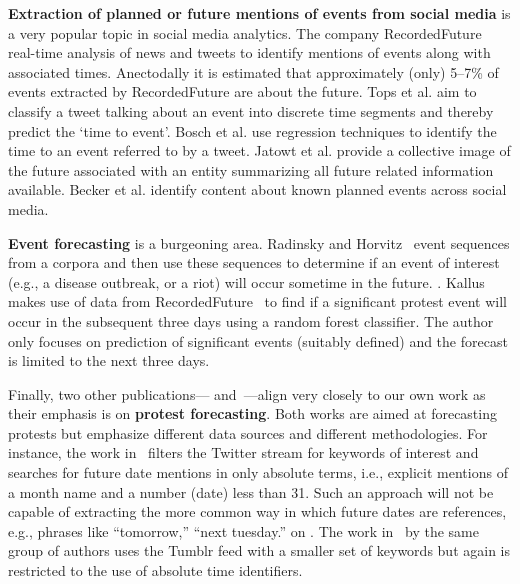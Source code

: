 {\bf Extraction of planned or future mentions of events from social media} is a very popular topic in social media
analytics.
The company 
RecordedFuture\cite{recordedFuture}  real-time analysis of news and tweets to identify mentions of events along with associated times. Anectodally it is estimated that approximately (only) 5--7\% of events extracted 
by RecordedFuture are about the future.
Tops et al.\cite{tops2013predicting} aim to classify a tweet talking about an event into discrete time segments and thereby predict the 
`time to event'.
Bosch et al.\cite{bosch2013estm} use regression techniques to identify the time to an event referred to by a tweet.
Jatowt et al. \cite{Jatowt:2011:ECE} provide a collective image of the future associated with an entity summarizing all future related information available.
Becker et al.\cite{Becker:2012:ICP} identify content about known planned events across social media.

{\bf Event forecasting} is a burgeoning area. 
Radinsky and Horvitz~\cite{Radinsky:2013:MWP} event sequences from a corpora and then use these sequences to determine if 
an event of interest (e.g., a disease outbreak, or a riot)
will occur sometime in the future.
\iffalse They only predict if an event of interest will happen in the future given the sequence of events seen but do not predict when/where(city level resolution) that event will happen \fi. 
Kallus~\cite{nathankallus} makes use of data from RecordedFuture~\cite{recordedFuture} to find if a  significant protest event will occur in 
the subsequent three days using a random forest classifier.
The author only focuses on prediction of significant events (suitably defined) and
the forecast is limited to the next three days.

Finally, two other publications---\cite{compton2013detecting} and~\cite{xu2014civil}---align very
closely to our own work as their emphasis is on {\bf protest forecasting}.
Both works are aimed at forecasting protests
but emphasize different data sources and different methodologies. For instance, the work in~\cite{compton2013detecting} filters the Twitter stream for
keywords of interest and searches for future date mentions in only absolute terms, i.e., explicit mentions of a month name and a number (date)
less than 31. 
Such an approach will not be capable of extracting the more
common way in which future dates are references, e.g., phrases like
``tomorrow,'' ``next tuesday.'' 
on \cite{hrlgeocoder}. The work in~\cite{xu2014civil} by the same group of authors uses the Tumblr feed with a smaller set of keywords but
again is restricted to the use of absolute time identifiers.

